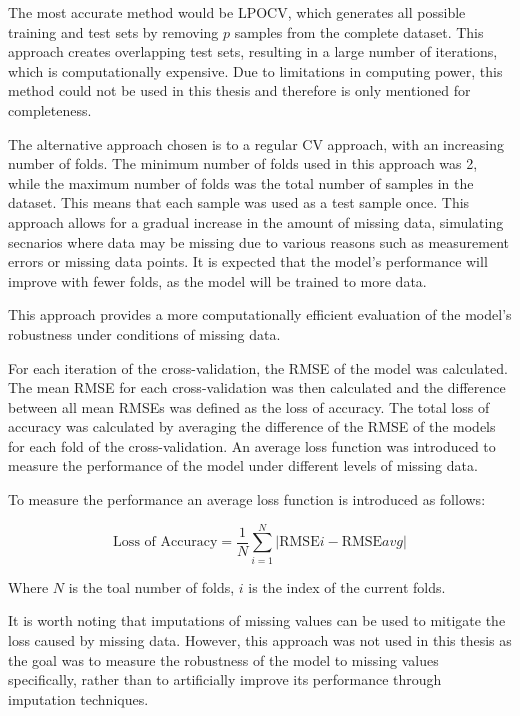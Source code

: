 The most accurate method would be \ac{LPOCV}, which generates all possible training and test
sets by removing $p$ samples from the complete dataset.
This approach creates overlapping test sets, resulting in a large number of iterations, which is
computationally expensive.
Due to limitations in computing power, this method could not be used in this thesis and therefore
is only mentioned for completeness.

The alternative approach chosen is to a regular \ac{CV} approach, with an increasing
number of folds.
The minimum number of folds used in this approach was 2, while the maximum number of folds was
the total number of samples in the dataset. This means that each sample was used as a test sample
once.
This approach allows for a gradual increase in the amount of missing data, simulating secnarios
where data may be missing due to various reasons such as measurement errors or missing data points.
It is expected that the
model's performance will improve with fewer folds, as the model will be trained to more data.

This approach provides a more computationally efficient evaluation of the model's robustness
under conditions of missing data.

For each iteration of the cross-validation, the \ac{RMSE} of the model was
calculated.
The mean \ac{RMSE} for each cross-validation was then calculated and the difference
between all mean RMSEs was defined as the loss of accuracy.
The total loss of accuracy was calculated by averaging the difference of the RMSE of the models
for each fold of the
cross-validation.
An average loss function was introduced to measure the performance of the model under different
levels of missing data.

To measure the performance an average loss function is introduced as follows:

\begin{tcolorbox}[arc=0pt,boxrule=0.5pt]
    \begin{equation}
        \label{eq:average_loss}
        \text{Loss of Accuracy} = \frac{1}{N} \sum_{i=1}^{N} |\text{RMSE}i - \text{RMSE}{avg}|
    \end{equation}
\end{tcolorbox}

Where $N$ is the toal number of folds, $i$ is the index of the current folds.

It is worth noting that imputations of missing values can be used to mitigate the loss
caused by missing data.
However, this approach was not used in this thesis as the goal
was to measure the robustness of the model to missing values specifically, rather than to
artificially improve its performance through imputation techniques.

